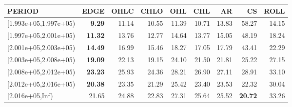 \begin{table}[ht]
\centering
\begin{tabular}{lrrrrrrrr}
  \hline
PERIOD & EDGE & OHLC & CHLO & OHL & CHL & AR & CS & ROLL \\ 
  \hline
[1.993e+05,1.997e+05) & \textbf{9.29} & 11.14 & 10.55 & 11.39 & 10.71 & 13.83 & 58.27 & 14.15 \\ 
  [1.997e+05,2.001e+05) & \textbf{11.32} & 13.76 & 12.77 & 14.64 & 13.77 & 15.05 & 48.19 & 18.24 \\ 
  [2.001e+05,2.003e+05) & \textbf{14.49} & 16.99 & 15.46 & 18.27 & 17.05 & 17.79 & 43.41 & 22.29 \\ 
  [2.003e+05,2.008e+05) & \textbf{19.09} & 22.13 & 19.15 & 24.10 & 21.50 & 21.81 & 25.22 & 27.15 \\ 
  [2.008e+05,2.012e+05) & \textbf{23.23} & 25.93 & 24.36 & 28.21 & 26.90 & 27.11 & 28.91 & 33.10 \\ 
  [2.012e+05,2.016e+05) & \textbf{20.38} & 23.35 & 21.29 & 25.42 & 23.40 & 23.53 & 22.32 & 30.04 \\ 
  [2.016e+05,Inf) & 21.65 & 24.88 & 22.83 & 27.31 & 25.64 & 25.52 & \textbf{20.72} & 33.26 \\ 
   \hline
\end{tabular}
\end{table}
